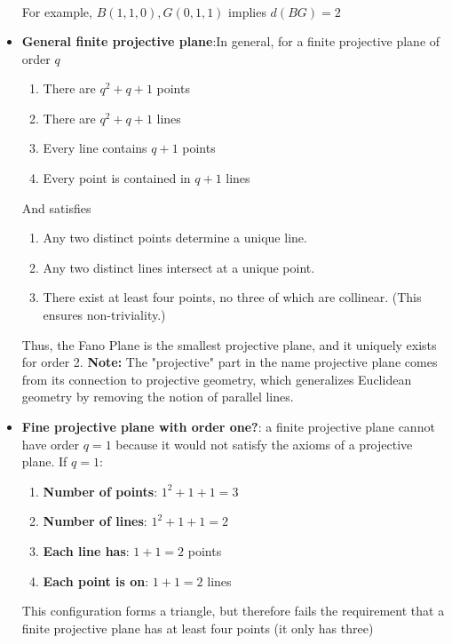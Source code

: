 \documentclass{report}
\begin{document}
\begin{itemize}
\begin{align*}
        \end{align*}
        \bigbreak \noindent 
        For example, $B(1,1,0), G(0,1,1)$ implies $d(BG) = 2 $
    \item \textbf{General finite projective plane}:In general, for a finite projective plane of order  $q$
        \begin{enumerate}
            \item There are $q^{2} + q + 1$ points
            \item There are $q^{2} + q + 1$ lines
            \item Every line contains $q+1$ points
            \item Every point is contained in $q+1$ lines
        \end{enumerate}
        \bigbreak \noindent 
        And satisfies
        \begin{enumerate}
            \item Any two distinct points determine a unique line.
            \item Any two distinct lines intersect at a unique point.
            \item There exist at least four points, no three of which are collinear. (This ensures non-triviality.)
        \end{enumerate}
        Thus, the Fano Plane is the smallest projective plane, and it uniquely exists for order 2.
        \bigbreak \noindent 
        \textbf{Note:} The "projective" part in the name projective plane comes from its connection to projective geometry, which generalizes Euclidean geometry by removing the notion of parallel lines.
    \item \textbf{Fine projective plane with order one?}: a finite projective plane cannot have order $q=1$ because it would not satisfy the axioms of a projective plane.
        \bigbreak \noindent 
        If $q=1$:
        \begin{enumerate}
            \item \textbf{Number of points}: $1^{2} + 1 + 1 =3$
            \item \textbf{Number of lines}: $1^{2} + 1 + 1 =2$
            \item \textbf{Each line has}: $1+1 = 2$ points
            \item \textbf{Each point is on}: $1+1=2$ lines
        \end{enumerate}
        \bigbreak \noindent 
        This configuration forms a triangle, but therefore fails the requirement that a finite projective plane has at least four points (it only has three)

\end{itemize}
\end{document}
